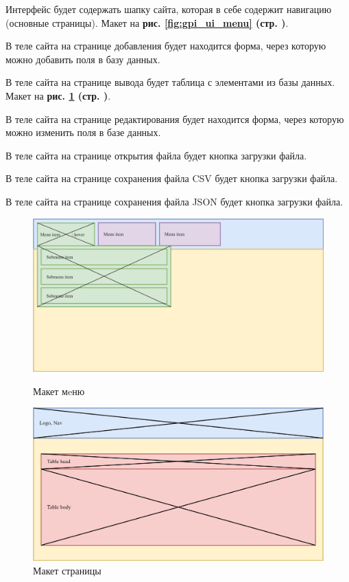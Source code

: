 Интерфейс будет содержать шапку сайта, которая в себе содержит навигацию (основные страницы).
Макет на \textbf{рис. \ref{fig:gpi_ui_menu} (стр. \pageref{fig:gpi_ui_menu})}.

В теле сайта на странице добавления будет находится форма,
через которую можно добавить поля в базу данных.

В теле сайта на странице вывода будет таблица с элементами из базы данных.
Макет на \textbf{рис. \ref{fig:gpi_ui_get} (стр. \pageref{fig:gpi_ui_get})}.

В теле сайта на странице редактирования будет находится форма,
через которую можно изменить поля в базе данных.

В теле сайта на странице открытия файла будет кнопка загрузки файла.

В теле сайта на странице сохранения файла CSV будет кнопка загрузки файла.

В теле сайта на странице сохранения файла JSON будет кнопка загрузки файла.

\begin{figure}[!htb]\centering
    \begin{minipage}{0.49\textwidth}
        \centering
        \includegraphics[width=0.99\linewidth]
            {_assets/gpi_ui_menu.png}
        \caption{Макет мeню}
        \label{fig:gpi_ui_menu}
    \end{minipage}
    \begin {minipage}{0.49\textwidth}
        \centering
        \includegraphics[width=0.99\linewidth]
            {_assets/gpi_ui_get.png}
        \caption{Макет страницы}
        \label{fig:gpi_ui_get}
    \end{minipage}
\end{figure}

\newpage
